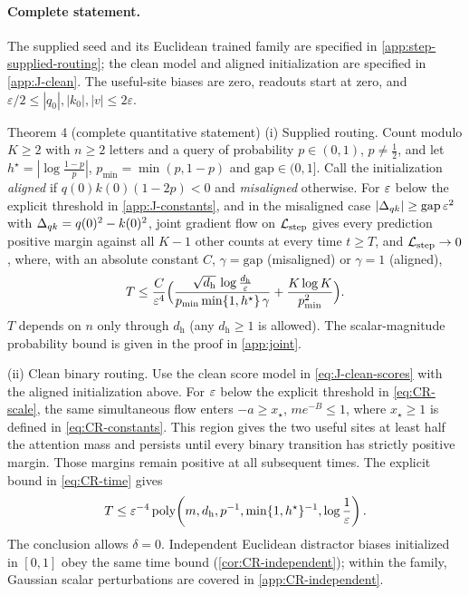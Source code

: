 \paragraph{Complete statement.}\label{app:J-full-statement}
The supplied seed and its Euclidean trained family are specified in
\cref{app:step-supplied-routing}; the clean model and aligned initialization
are specified in \cref{app:J-clean}. The useful-site biases are zero,
readouts start at zero, and $\varepsilon/2\le|q_0|,|k_0|,|v|\le2\varepsilon$.
\begin{restated}{Theorem 4 (complete quantitative statement)}
\textnormal{(i) Supplied routing.} Count modulo $K\ge2$ with $n\ge2$ letters and a query of probability $p\in(0,1)$, $p\neq\tfrac{1}{2}$, and let $h^\star=|\log\tfrac{1-p}{p}|$,
$p_{\min}=\min(p,1-p)$ and $\mathrm{gap}\in(0,1]$. Call the initialization \emph{aligned} if $q(0)k(0)(1-2p)<0$ and \emph{misaligned} otherwise.
For $\varepsilon$ below the explicit threshold in \cref{app:J-constants}, and in the misaligned case
$|\Delta_{qk}|\ge\mathrm{gap}\,\varepsilon^2$ with $\Delta_{qk}=q(0)^2-k(0)^2$, joint gradient flow on $\mathcal L_{\mathrm{step}}$ gives
every prediction positive margin against all $K-1$ other counts at every time $t\ge T$, and $\mathcal L_{\mathrm{step}}\to0$, where, with an absolute constant $C$,
$\gamma=\mathrm{gap}$ (misaligned) or $\gamma=1$ (aligned),
\[
 T\le\frac{C}{\varepsilon^4}\Bigl(\frac{\sqrt{d_{\mathrm h}}\,\log\frac{d_{\mathrm h}}{\varepsilon}}{p_{\min}\min\{1,h^\star\}\,\gamma}+\frac{K\log K}{p_{\min}^2}\Bigr).
\]
$T$ depends on $n$ only through $d_{\mathrm h}$ (any $d_{\mathrm h}\ge1$ is allowed).
The scalar-magnitude probability bound is given in the proof in \cref{app:joint}.

\textnormal{(ii) Clean binary routing.} Use the clean score model in \cref{eq:J-clean-scores} with the aligned initialization above.
For $\varepsilon$ below the explicit threshold in \cref{eq:CR-scale}, the same simultaneous flow
enters $-a\ge x_\star$, $me^{-B}\le1$, where $x_\star\ge1$ is defined in \cref{eq:CR-constants}.
This region gives the two useful sites at least half the attention mass and persists until every binary transition has
strictly positive margin. Those margins remain positive at all subsequent times. The explicit bound in \cref{eq:CR-time} gives
\[
 T\le\varepsilon^{-4}\operatorname{poly}\!\left(m,d_{\mathrm h},p^{-1},
 \min\{1,h^\star\}^{-1},\log\frac1{\varepsilon}\right).
\]
The conclusion allows $\delta=0$. Independent Euclidean distractor biases initialized in $[0,1]$ obey the same time bound
(\cref{cor:CR-independent}); within the family, Gaussian scalar perturbations are covered in \cref{app:CR-independent}.
\end{restated}